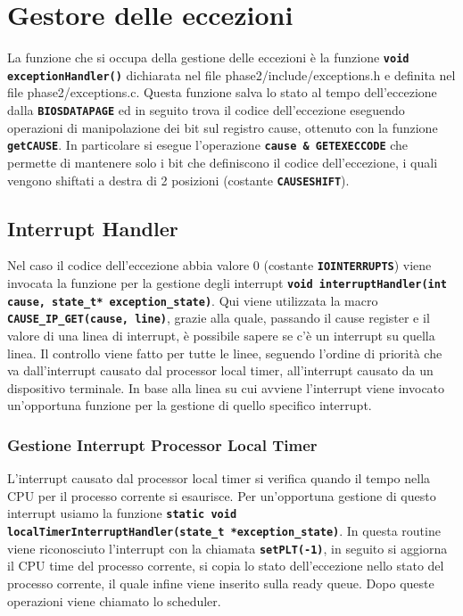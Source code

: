 \documentclass{article}
\begin{document}
\section{Gestore delle eccezioni}
La funzione che si occupa della gestione delle eccezioni è la funzione \texttt{\textbf{void exceptionHandler()}} dichiarata 
nel file phase2/include/exceptions.h e definita nel file phase2/exceptions.c. Questa funzione salva lo stato al tempo dell'eccezione dalla \texttt{\textbf{BIOSDATAPAGE}} ed in seguito trova il codice dell'eccezione eseguendo operazioni di manipolazione dei bit sul registro cause, ottenuto con la funzione \texttt{\textbf{getCAUSE}}. In particolare si esegue l'operazione 
\texttt{\textbf{cause \& GETEXECCODE}} che permette di mantenere solo i bit che definiscono il codice dell'eccezione, i quali vengono shiftati a destra di 2 posizioni (costante \texttt{\textbf{CAUSESHIFT}}). 
\subsection{Interrupt Handler}
Nel caso il codice dell'eccezione abbia valore 0 (costante \texttt{\textbf{IOINTERRUPTS}}) viene invocata la funzione per la 
gestione degli interrupt \texttt{\textbf{void interruptHandler(int cause, state\_t* exception\_state)}}. Qui viene 
utilizzata la macro \texttt{\textbf{CAUSE\_IP\_GET(cause, line)}}, grazie alla quale, passando il cause register e il 
valore di una linea di interrupt, è possibile sapere se c'è un interrupt su quella linea. Il controllo viene fatto per tutte 
le linee, seguendo l'ordine di priorità che va dall'interrupt causato dal processor local timer, all'interrupt causato da un 
dispositivo terminale. In base alla linea su cui avviene l'interrupt viene invocato un'opportuna funzione per la gestione 
di quello specifico interrupt.
\subsubsection{Gestione Interrupt Processor Local Timer}
L'interrupt causato dal processor local timer si verifica quando il tempo nella CPU per il processo corrente si esaurisce. 
Per un'opportuna gestione di questo interrupt usiamo la funzione \texttt{\textbf{static void localTimerInterruptHandler(state\_t *exception\_state)}}. In questa routine viene riconosciuto l'interrupt con la chiamata \texttt{\textbf{setPLT(-1)}}, 
in seguito si aggiorna il CPU time del processo corrente, si copia lo stato dell'eccezione nello stato del processo corrente, il quale infine viene inserito sulla ready queue. Dopo queste operazioni viene chiamato lo scheduler.
\end{document}
